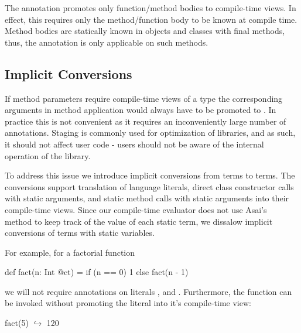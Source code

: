 The  annotation promotes only function/method bodies to compile-time views. In effect,
 this requires only the method/function body to be known at compile time. Method bodies
 are statically known in objects and classes with final methods, thus, the 
 annotation is only applicable on such methods.

\subsection{Implicit Conversions}
\label{sct:implicits}

If method parameters require compile-time views of a type the corresponding arguments
 in method application would always have to be promoted to .
 In practice this is not convenient as it requires an inconveniently large number
 of annotations. Staging is commonly used for optimization of libraries, and as such, it should not
 affect user code - users should not be aware of the internal operation of the library.

To address this issue we introduce implicit conversions from  terms to  terms.
 The conversions support translation of language literals, direct class constructor calls with static arguments, and static method
 calls with static arguments into their compile-time views. Since our compile-time evaluator does
 not use Asai's~\cite{asai2002binding,sumii2001hybrid} method to keep track of
 the value of each static term, we dissalow implicit conversions of terms with static variables.

For example, for a factorial function \begin{lstparagraph}
def fact(n: Int @ct) = if (n == 0) 1 else fact(n - 1)
 \end{lstparagraph} we will not require annotations on literals , and . Furthermore,
 the function can be invoked without promoting the literal  into it's compile-time view:\begin{lstparagraph}
fact(5)
  $\hookrightarrow$ 120
 \end{lstparagraph}
